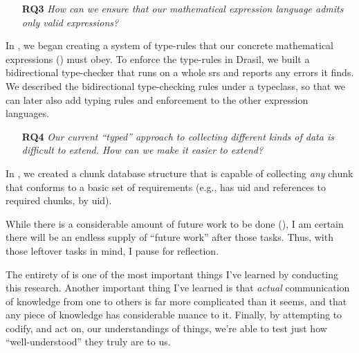 \begin{enumerate}

    \item[\textbf{RQ3}] \textit{How can we ensure that our mathematical
          expression language admits only valid expressions?}

\end{enumerate}

In , we began creating a system of type-rules that our
concrete mathematical expressions (\Expr{}) must obey. To enforce the type-rules
in Drasil, we built a bidirectional type-checker that runs on a whole \acs{srs}
and reports any errors it finds. We described the bidirectional type-checking
rules under a typeclass, so that we can later also add typing rules and
enforcement to the other expression languages.

\begin{enumerate}

    \item[\textbf{RQ4}] \textit{Our current ``typed'' approach to collecting
          different kinds of data is difficult to extend. How can we make it
          easier to extend?}

\end{enumerate}

In , we created a chunk database structure that is
capable of collecting \textit{any} chunk that conforms to a basic set of
requirements (e.g., has \acs{uid} and references to required chunks, by
\acs{uid}).

While there is a considerable amount of future work to be done
(), I am certain there will be an endless supply of
``future work'' after those tasks. Thus, with those leftover tasks in mind, I
pause for reflection.

The entirety of  is one of the most important things I've
learned by conducting this research. Another important thing I've learned is
that \textit{actual} communication of knowledge from one to others is far more
complicated than it seems, and that any piece of knowledge has considerable
nuance to it. Finally, by attempting to codify, and act on, our understandings
of things, we're able to test just how ``well-understood''
\cite{well-understood} they truly are to us.
